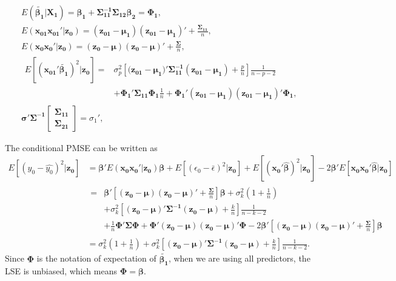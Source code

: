 $$\begin{aligned}
&E(\boldsymbol{\tilde{\beta_1}}|\boldsymbol{X_1})=\boldsymbol{\beta_1}+\boldsymbol{\Sigma_{11}^{-1}\Sigma_{12}\beta_{2}} = \boldsymbol{\Phi_1}, \label{lemmaA1}\\
&E(\boldsymbol{x_{01}x_{01}'}|\boldsymbol{z_0})=(\boldsymbol{z_{01}}-\boldsymbol{\mu_1})(\boldsymbol{z_{01}}-\boldsymbol{\mu_1})'+\frac{\boldsymbol{\Sigma_{11}}}{n},\label{LemmaA3}\\
&E(\boldsymbol{x_0x_0'}|\boldsymbol{z_0})=(\boldsymbol{z_0-\mu})(\boldsymbol{z_0}-\boldsymbol{\mu})'+\frac{\boldsymbol{\Sigma}}{n},\label{LemmaA3.1}\\
&
\begin{aligned}E[(\boldsymbol{x_{01}'\tilde{\beta_1}})^2|\boldsymbol{z_0}]
=&\sigma_p^2 \left[(\boldsymbol{z_{01}-\mu_1)'\Sigma_{11}^{-1}(z_{01}-\mu_1)}+\frac{p}{n}\right]\frac{1}{n-p-2}\\
&+\boldsymbol{\Phi_1'\Sigma_{11}\Phi_1}\frac{1}{n}+\boldsymbol{\Phi_{1}'(z_{01}-\mu_{1})(z_{01}-\mu_1)'\Phi_1},\label{LemmaA7}
\end{aligned}\\
&\boldsymbol{\sigma'\Sigma^{-1}}
\begin{bmatrix}
\boldsymbol{\Sigma_{11}}\\ \boldsymbol{\Sigma_{21}}\end{bmatrix}=\sigma_1',\label{LemmaA9}
\end{aligned}
$$

The conditional PMSE can be written as
$$\begin{aligned}
E[(y_0-\hat{y_0})^2|\boldsymbol{z_0}]
&=\boldsymbol{\beta'}E(\boldsymbol{x_0x_0'}|\boldsymbol{z_0})\boldsymbol{\beta}+E[(\epsilon_0-\bar{\epsilon})^2|\boldsymbol{z_0}]+E[(\boldsymbol{x_0'\hat{\beta}})^2|\boldsymbol{z_0}]-2\boldsymbol{\beta'}E[\boldsymbol{x_0x_0'\hat{\beta}}|\boldsymbol{z_0}]\\
&\begin{aligned}=&\boldsymbol{\beta}' \left[\boldsymbol{(z_0-\mu)(z_0-\mu)'}+\frac{\boldsymbol{\Sigma}}{n} \right]\boldsymbol{\beta}+\sigma_k^2 \left(1+\frac{1}{n}\right)\\
&+\sigma_{k}^2 \left[\boldsymbol{(z_0-\mu)'\Sigma^{-1}(z_0-\mu)}+\frac{k}{n} \right]\frac{1}{n-k-2}\\
&+\frac{1}{n}\boldsymbol{\Phi'\Sigma\Phi}+\boldsymbol{\Phi'(z_{0}-\mu)(z_{0}-\mu)'\Phi}-2\boldsymbol{\beta'}\left[\boldsymbol{(z_0-\mu)(z_0-\mu)'}+\frac{\boldsymbol{\Sigma}}{n} \right]\boldsymbol{\beta}
\end{aligned}\\
&=\sigma_k^2\left(1+\frac{1}{n}\right)+\sigma_k^2 \left[\boldsymbol{(z_0-\mu)'\Sigma^{-1}(z_0-\mu)}+\frac{k}{n} \right]\frac{1}{n-k-2}.
\end{aligned}$$
Since $\boldsymbol{\Phi}$ is the notation of expectation of $\boldsymbol{\tilde{\beta_1}}$, when we are using all predictors, the LSE is unbiased, which means $\boldsymbol{\Phi} = \boldsymbol{\beta}$. 

